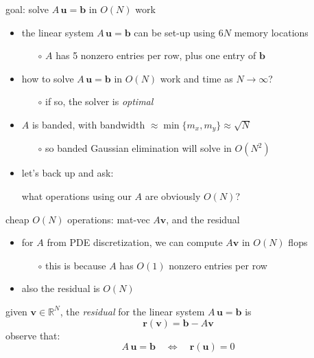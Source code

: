 \documentclass[10pt,
               svgnames,
               hyperref={colorlinks,citecolor=DeepPink4,linkcolor=FireBrick,urlcolor=Maroon},
               usepdftitle=false]{beamer}
\newcommand{\bb}{\mathbf{b}}
\newcommand{\br}{\mathbf{r}}
\newcommand{\bu}{\mathbf{u}}
\newcommand{\bv}{\mathbf{v}}
\newcommand{\RR}{\mathbb{R}}
\begin{document}
\begin{frame}{goal: solve $A\,\bu=\bb$ in $O(N)$ work}
\begin{itemize}
\item the linear system $A\,\bu=\bb$ can be set-up using  $6N$ memory locations
	\begin{itemize}
	\item[$\circ$] $A$ has 5 nonzero entries per row, plus one entry of $\bb$
	\end{itemize}
\item how to solve $A\,\bu=\bb$ in $O(N)$ work and time as $N\to\infty$?
	\begin{itemize}
	\item[$\circ$] if so, the solver is \emph{optimal}
	\end{itemize}

\bigskip
\item<2-> $A$ is banded, with bandwidth $\approx \min\{m_x,m_y\} \approx \sqrt{N}$
	\begin{itemize}
	\item[$\circ$] so banded Gaussian elimination will solve in $O(N^2)$
	\end{itemize}

\bigskip
\item<3> let's back up and ask:

\medskip
\qquad what operations using our $A$ are obviously $O(N)$?
\end{itemize}
\end{frame}


\begin{frame}{cheap $O(N)$ operations: mat-vec $A\bv$, and the residual}
\begin{itemize}
\item for $A$ from PDE discretization, we can compute $A\bv$ in $O(N)$ flops
	\begin{itemize}
	\item[$\circ$] this is because $A$ has $O(1)$ nonzero entries per row
	\end{itemize}
\item also the residual is $O(N)$
\end{itemize}

\bigskip
\begin{definition} given $\bv \in\RR^N$, the \emph{residual} for the linear system $A\,\bu=\bb$ is
	$$\br(\bv) = \bb - A\bv$$
observe that:
    $$A\,\bu = \bb \quad \iff \quad \br(\bu) = 0$$
\end{definition}
\end{frame}
\end{document}
